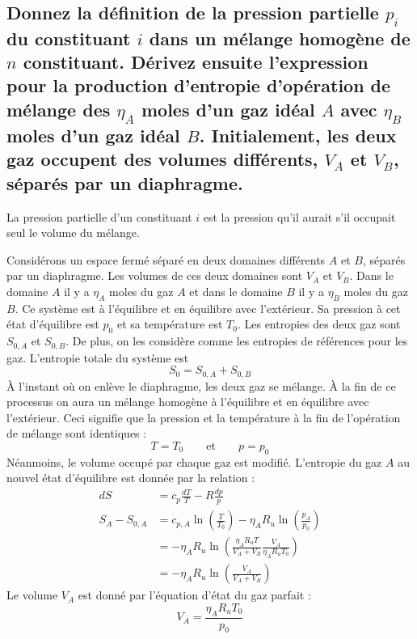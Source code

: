 \subsection{Donnez la définition de la pression partielle $p_i$ du constituant $i$ dans un mélange homogène de $n$ constituant. Dérivez ensuite l'expression pour la production d'entropie d'opération de mélange des $\eta_A$ moles d'un gaz idéal $A$ avec $\eta_B$ moles d'un gaz idéal $B$. Initialement, les deux gaz occupent des volumes différents, $V_A$ et $V_B$, séparés par un diaphragme.}
La pression partielle d'un constituant $i$ est la pression qu'il aurait s'il occupait seul le volume du mélange.

Considérons un espace fermé séparé en deux domaines différents $A$ et $B$, séparés par un diaphragme. Les volumes de ces deux domaines sont $V_A$ et $V_B$. Dans le domaine $A$ il y a $\eta_A$ moles du gaz $A$ et dans le domaine $B$ il y a $\eta_B$ moles du gaz $B$. Ce système est à l'équilibre et en équilibre avec l'extérieur. Sa pression à cet état d'équilibre est $p_0$ et sa température est $T_0$. Les entropies des deux gaz sont $S_{0,A}$ et $S_{0,B}$. De plus, on les considère comme les entropies de références pour les gaz. L'entropie totale du système est 
\begin{equation} S_0 = S_{0,A} + S_{0,B} \end{equation}
À l'instant où on enlève le diaphragme, les deux gaz se mélange. À la fin de ce processus on aura un mélange homogène à l'équilibre et en équilibre avec l'extérieur. Ceci signifie que la pression et la température à la fin de l'opération de mélange sont identiques :
\begin{equation} T = T_0 \qquad \text{et} \qquad p = p_0 \end{equation}
Néanmoins, le volume occupé par chaque gaz est modifié. L'entropie du gaz $A$ au nouvel état d'équilibre est donnée par la relation :
\begin{align} dS &= c_p\frac{dT}{T} - R\frac{dp}{p} \\ S_A - S_{0,A} &= c_{p,A}\ln\left(\frac{T}{T_0}\right) - \eta_AR_u\ln\left(\frac{p_A}{p_0}\right) \\ &= -\eta_AR_u\ln\left(\frac{\eta_AR_uT}{V_A + V_B}\frac{V_A}{\eta_AR_uT_0}\right) \\ &= -\eta_AR_u\ln\left(\frac{V_A}{V_A+V_B}\right) \end{align}
Le volume $V_A$ est donné par l'équation d'état du gaz parfait :
\begin{equation} V_A = \frac{\eta_AR_uT_0}{p_0} \end{equation}
